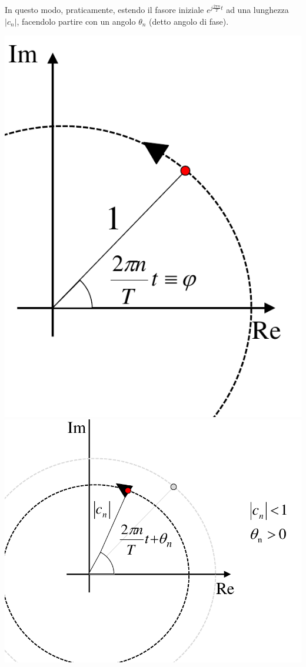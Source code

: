 \documentclass[a4paper, 10pt]{report}
\begin{document}
\noindent In questo modo, praticamente, estendo il fasore iniziale $e^{j\frac{2 \pi n}{T} t}$ ad una lunghezza $|c_n|$, facendolo partire con un angolo $\theta_n$ (detto angolo di fase). 
\begin{center}
\includegraphics[scale=0.4]{2.pdf}
\hspace{2cm}
\includegraphics[scale=0.4]{3.pdf}
\end{center}
\end{document}
